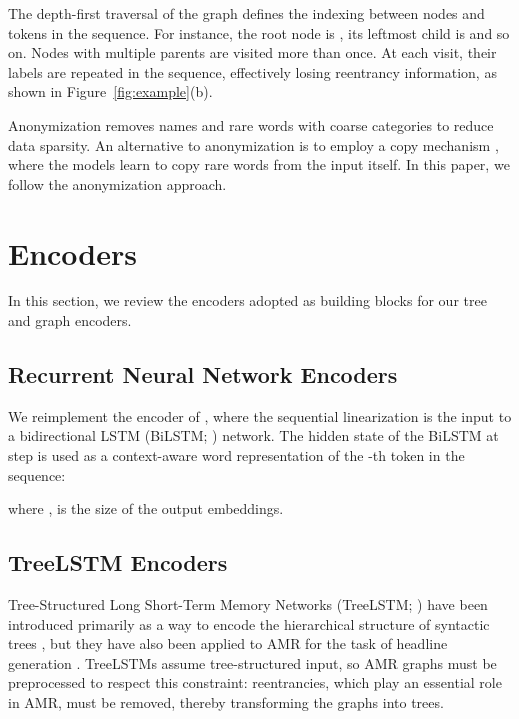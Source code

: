 \documentclass[11pt,a4paper]{article}
\begin{document}
The depth-first traversal of the graph defines the indexing between nodes and tokens in the sequence. For instance, the root node is , its leftmost child is  and so on. 
Nodes with multiple parents are visited more than once. At each visit, their labels are repeated in the sequence, effectively losing reentrancy information, as shown in Figure~\ref{fig:example}(b).

Anonymization removes names and rare words with coarse categories to reduce data sparsity. 
An alternative to anonymization is to employ a copy mechanism \cite{gulcehre2016pointing}, where the models learn to copy rare words from the input itself. In this paper, we follow the anonymization approach. 

\section{Encoders}

In this section, we review the encoders adopted as building blocks for our tree and graph encoders. 


\subsection{Recurrent Neural Network Encoders}
\label{sec:sequential}

We reimplement the encoder of , where the sequential linearization is the input to a bidirectional LSTM (BiLSTM; \citealt{graves2013speech}) network. The hidden state of the BiLSTM at step  is used as a context-aware word representation of the -th token in the sequence:

where ,  is the size of the output embeddings. 


\subsection{TreeLSTM Encoders}
\label{sec:tree_encoders}

Tree-Structured Long Short-Term Memory Networks (TreeLSTM; \citealt{tai2015improved}) have been introduced primarily as a way to encode the hierarchical structure of syntactic trees \cite{tai2015improved}, but they have also been applied to AMR for the task of headline generation \cite{takase2016neural}. 
TreeLSTMs assume tree-structured input, so AMR graphs must be preprocessed to respect this constraint: reentrancies, which play an essential role in AMR, must be removed, thereby transforming the graphs into trees. 
\end{document}
